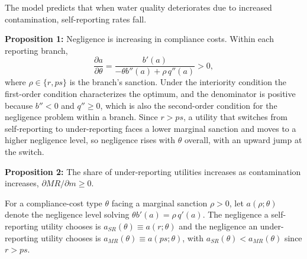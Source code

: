 \documentclass[12pt]{article}
\begin{document}
	The model predicts that when water quality deteriorates due to increased contamination, self-reporting rates fall.
	
	\textbf{Proposition 1:} Negligence is increasing in compliance costs. Within each reporting branch,
    \[\frac{\partial a}{\partial\theta} = \frac{b'(a)}{-\theta b''(a) + \rho\, q''(a)} > 0,\]
    where $\rho \in \{r, ps\}$ is the branch's sanction. Under the interiority condition the first-order condition characterizes the optimum, and the denominator is positive because $b'' < 0$ and $q'' \ge 0$, which is also the second-order condition for the negligence problem within a branch. Since $r > ps$, a utility that switches from self-reporting to under-reporting faces a lower marginal sanction and moves to a higher negligence level, so negligence rises with $\theta$ overall, with an upward jump at the switch.
	
	\textbf{Proposition 2:} The share of under-reporting utilities increases as contamination increases, $\partial MR/\partial m \ge 0$.

    For a compliance-cost type $\theta$ facing a marginal sanction $\rho > 0$, let $a(\rho;\theta)$ denote the negligence level solving $\theta b'(a) = \rho\,q'(a)$. The negligence a self-reporting utility chooses is $a_{SR}(\theta) \equiv a(r;\theta)$ and the negligence an under-reporting utility chooses is $a_{MR}(\theta) \equiv a(ps;\theta)$, with $a_{SR}(\theta) < a_{MR}(\theta)$ since $r > ps$.
\end{document}
